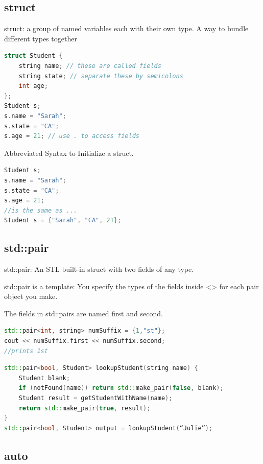 \documentclass[12pt, a4paper, oneside]{ctexbook}
\begin{document}
\subsection{struct}

struct: a group of named
variables
each with their
own type. A way to
bundle different types
together


\begin{lstlisting}[language=c++]
struct Student {
    string name; // these are called fields
    string state; // separate these by semicolons
    int age;
};
Student s;
s.name = "Sarah";
s.state = "CA";
s.age = 21; // use . to access fields
\end{lstlisting}

Abbreviated Syntax to Initialize a struct.

\begin{lstlisting}[language=c++]
Student s;
s.name = "Sarah";
s.state = "CA";
s.age = 21;
//is the same as ...
Student s = {"Sarah", "CA", 21};
\end{lstlisting}

\subsection{std::pair}

std::pair: An STL
built-in struct with
two fields
of any type.

std::pair is a template: You specify the types of the
fields inside <> for each pair object you make.

The fields in std::pairs are named first and
second.

\begin{lstlisting}[language=c++]
std::pair<int, string> numSuffix = {1,"st"};
cout << numSuffix.first << numSuffix.second;
//prints 1st
\end{lstlisting}

\begin{lstlisting}[language=c++]
std::pair<bool, Student> lookupStudent(string name) {
    Student blank;
    if (notFound(name)) return std::make_pair(false, blank);
    Student result = getStudentWithName(name);
    return std::make_pair(true, result);
}
std::pair<bool, Student> output = lookupStudent(“Julie”);
\end{lstlisting}

\subsection{auto}
\end{document}
